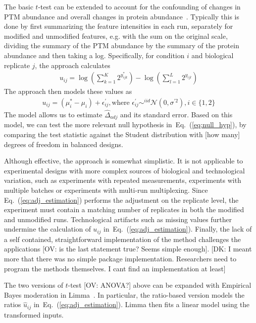 \documentclass[mcp]{article}
\numberwithin{table}{section}
\def\todo#1{{\color{red}[#1]}}
\def\eqref#1{Eq.~(\ref{eq:#1})}
\begin{document}
\medskip \noindent 
The basic $t$-test can be extended to account for the confounding of changes in PTM abundance and overall changes in protein abundance~\cite{Schwammle2015,THOMAS2020,Mertins:2013}. Typically this is done by first summarizing the feature intensities in each run, separately for modified and unmodified features, e.g. with the sum on the original scale, dividing the summary of the PTM abundance by the summary of the protein abundance and then taking a log. Specifically, for condition $i$ and biological replicate $j$, the approach calculates
\begin{eqnarray}
u_{ij} = \log \left( \sum_{k=1}^{K} 2^{y_{ijk}^{\ast}} \right) - \log \left( \sum_{l=1}^{L} 2^{y_{ijl}} \right)
\label{eq:adj_estimation}
\end{eqnarray}
The approach then models these values as
\begin{eqnarray}
u_{ij} = (\mu^{\ast}_{i}-\mu_i) + \epsilon^{\prime}_{ij}, \text{where } \epsilon^{\prime}_{ij} \mathop\sim^{iid} \mathcal{N}(0, \sigma^{\prime 2}), i \in \{1, 2\}
\label{eq:ttest_model}
\end{eqnarray}
The model allows us to estimate $\hat{\Delta}_{adj}$ and its standard error.
Based on this model, we can test the more relevant null hypothesis in~\eqref{null_hyp}, by comparing the test statistic against the Student distribution with \todo{how many} degrees of freedom in balanced designs.

Although effective, the approach is somewhat simplistic. It is not applicable to experimental designs with more complex sources of biological and technological variation, such as experiments with repeated measurements, experiments with multiple batches or experiments with multi-run multiplexing. Since \eqref{adj_estimation} performs the adjustment on the replicate level, the experiment must contain a matching number of replicates in both the modified and unmodified runs. Technological artifacts such as missing values further undermine the calculation of $u_{ij}$ in~\eqref{adj_estimation}. Finally, the lack of a self contained, straightforward implementation of the method challenges the applications \todo{OV: is the last statement true? Seems simple enough}. \todo{DK: I meant more that there was no simple package implementation. Researchers need to program the methods themselves. I cant find an implementation at least}


\medskip {} 

\medskip \noindent The two versions of $t$-test \todo{OV: ANOVA?} above can be expanded with Empirical Bayes moderation in Limma~\cite{ Ritchie_15a, Schwammle2015, Smyth:2004, Smyth:2005, Zhu,Chappell:2021}. In particular, the ratio-based version models the ratios $\hat{u}_{ij}$ in~\eqref{adj_estimation}. Limma then fits a linear model using the transformed inputs.
\end{document}
